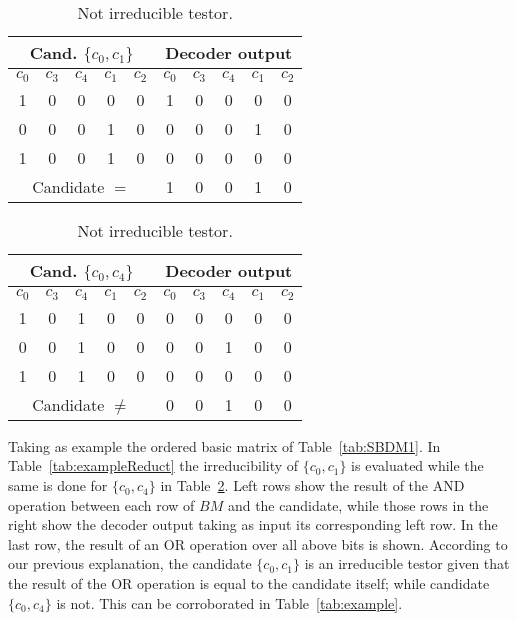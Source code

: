 \documentclass[letterpaper, twoside, openright, 12pt]{book}%
\begin{document}
	\setlength{\tabcolsep}{3pt} %
	\begin{table}[!htb]
	    \begin{minipage}{.5\linewidth}
	      \caption{Irreducible testor.}\label{tab:exampleReduct}
	      \centering
	        \begin{tabular}{ ccccc|ccccc }
	 			\hline                       
	  			\multicolumn{5}{c|}{Cand. $\{c_0, c_1\}$} & 
	  			\multicolumn{5}{c}{Decoder output} \\
	  			\hline
				  $c_0$ &   $c_3$ &   $c_4$ &   $c_1$ &   $c_2$ &
	  			  $c_0$ &   $c_3$ &   $c_4$ &   $c_1$ &   $c_2$ \\
	  			\hline
	  			1 & 0 & 0 & 0 & 0 & 1 & 0 & 0 & 0 & 0\\
	  			0 & 0 & 0 & 1 & 0 & 0 & 0 & 0 & 1 & 0\\
	  			1 & 0 & 0 & 1 & 0 & 0 & 0 & 0 & 0 & 0\\
	  			\hline  
	  			\multicolumn{5}{c|}{Candidate $=$} & 1 & 0 & 0 & 1 & 0\\
	  			\hline  
			\end{tabular}
			
	    \end{minipage}%
	    \begin{minipage}{.5\linewidth}
	      \centering
	        \caption{Not irreducible testor.}\label{tab:exampleNonReduct}
	        \begin{tabular}{ ccccc|ccccc }
	 			\hline                       
	  			\multicolumn{5}{c|}{Cand. $\{c_0, c_4\}$} & 
	  			\multicolumn{5}{c}{Decoder output} \\
	  			\hline
	  			  $c_0$ &   $c_3$ &   $c_4$ &   $c_1$ &   $c_2$ &
	  			  $c_0$ &   $c_3$ &   $c_4$ &   $c_1$ &   $c_2$ \\
	  			\hline
	  			1 & 0 & 1 & 0 & 0 & 0 & 0 & 0 & 0 & 0\\
	  			0 & 0 & 1 & 0 & 0 & 0 & 0 & 1 & 0 & 0\\
	  			1 & 0 & 1 & 0 & 0 & 0 & 0 & 0 & 0 & 0\\
	  			\hline  
	  			\multicolumn{5}{c|}{Candidate $\neq$} & 0 & 0 & 1 & 0 & 0\\
	  			\hline  
			\end{tabular}
	    \end{minipage} 
	\end{table}
	Taking as example the ordered basic matrix of Table~\ref{tab:SBDM1}. In Table~\ref{tab:exampleReduct} the irreducibility of $\{c_0,c_1\}$ is evaluated while the same is done for $\{c_0,c_4\}$ in Table~\ref{tab:exampleNonReduct}. Left rows show the result of the AND operation between each row of $BM$ and the candidate, while those rows in the right show the decoder output taking as input its corresponding left row. In the last row, the result of an OR operation over all above bits is shown. According to our previous explanation, the candidate $\{c_0,c_1\}$ is an irreducible testor given that the result of the OR operation is equal to the candidate itself; while candidate $\{c_0,c_4\}$ is not. This can be corroborated in Table~\ref{tab:example}.	
	
\end{document}
